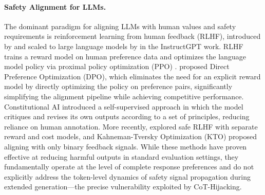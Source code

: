 \documentclass[11pt]{article}
\begin{document}
\paragraph{Safety Alignment for LLMs.}
The dominant paradigm for aligning LLMs with human values and safety requirements is reinforcement learning from human feedback (RLHF), introduced by \citet{christiano2017deep} and scaled to large language models by \citet{ouyang2022training} in the InstructGPT work. RLHF trains a reward model on human preference data and optimizes the language model policy via proximal policy optimization (PPO) \citep{schulman2017proximal}. \citet{rafailov2023direct} proposed Direct Preference Optimization (DPO), which eliminates the need for an explicit reward model by directly optimizing the policy on preference pairs, significantly simplifying the alignment pipeline while achieving competitive performance. Constitutional AI \citep{bai2022constitutional} introduced a self-supervised approach in which the model critiques and revises its own outputs according to a set of principles, reducing reliance on human annotation. More recently, \citet{dai2024safe} explored safe RLHF with separate reward and cost models, and Kahneman-Tversky Optimization (KTO) \citep{ethayarajh2024kto} proposed aligning with only binary feedback signals. While these methods have proven effective at reducing harmful outputs in standard evaluation settings, they fundamentally operate at the level of complete response preferences and do not explicitly address the token-level dynamics of safety signal propagation during extended generation---the precise vulnerability exploited by CoT-Hijacking.
\end{document}
